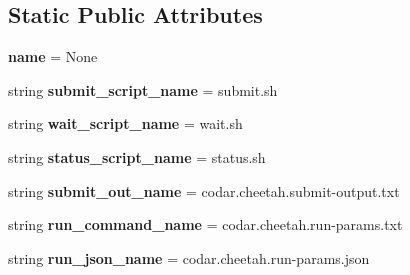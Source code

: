 \subsection*{Static Public Attributes}
\begin{DoxyCompactItemize}
\item 
\mbox{\label{classcodar_1_1cheetah_1_1launchers_1_1_launcher_aafbd307fbd2b8605a6e26bfda6e4cebe}} 
{\bfseries name} = None
\item 
\mbox{\label{classcodar_1_1cheetah_1_1launchers_1_1_launcher_ad49a82359a5f1fb129b34133e1068e92}} 
string {\bfseries submit\+\_\+script\+\_\+name} = \textquotesingle{}submit.\+sh\textquotesingle{}
\item 
\mbox{\label{classcodar_1_1cheetah_1_1launchers_1_1_launcher_ab98a74ab3f9677e140eff974e94f6937}} 
string {\bfseries wait\+\_\+script\+\_\+name} = \textquotesingle{}wait.\+sh\textquotesingle{}
\item 
\mbox{\label{classcodar_1_1cheetah_1_1launchers_1_1_launcher_ac3f6ab253b5fc5783e7b489da303a7d6}} 
string {\bfseries status\+\_\+script\+\_\+name} = \textquotesingle{}status.\+sh\textquotesingle{}
\item 
\mbox{\label{classcodar_1_1cheetah_1_1launchers_1_1_launcher_aa4bbb4d58ed4af3a90c81b715bb32c90}} 
string {\bfseries submit\+\_\+out\+\_\+name} = \textquotesingle{}codar.\+cheetah.\+submit-\/output.\+txt\textquotesingle{}
\item 
\mbox{\label{classcodar_1_1cheetah_1_1launchers_1_1_launcher_ad7f51985a666c18fa6b7944b8c09183e}} 
string {\bfseries run\+\_\+command\+\_\+name} = \textquotesingle{}codar.\+cheetah.\+run-\/params.\+txt\textquotesingle{}
\item 
\mbox{\label{classcodar_1_1cheetah_1_1launchers_1_1_launcher_a400ec02171709c55f11c7efa54a50d1b}} 
string {\bfseries run\+\_\+json\+\_\+name} = \textquotesingle{}codar.\+cheetah.\+run-\/params.\+json\textquotesingle{}

\end{DoxyCompactItemize}
